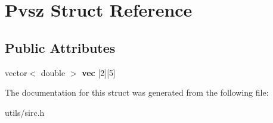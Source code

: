 \hypertarget{struct_pvsz}{}\section{Pvsz Struct Reference}
\label{struct_pvsz}
\subsection*{Public Attributes}
\begin{DoxyCompactItemize}
\item 
\mbox{\label{struct_pvsz_abacf79b8ed67624c8e21ecdee1c99dac}} 
vector$<$ double $>$ {\bfseries vec} \mbox{[}2\mbox{]}\mbox{[}5\mbox{]}
\end{DoxyCompactItemize}


The documentation for this struct was generated from the following file\+:\begin{DoxyCompactItemize}
\item 
utils/sirc.\+h\end{DoxyCompactItemize}
